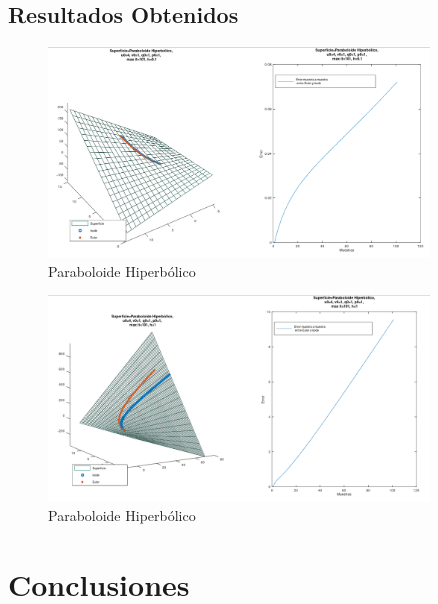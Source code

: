 \documentclass{endm}
\begin{document}
\subsection{Resultados Obtenidos}



\begin{figure}[H]
\caption{Paraboloide Hiperb\'olico}
\centering
\includegraphics[width=0.9\textwidth]{ph.png}
\end{figure}



\begin{figure}[H]
\caption{Paraboloide Hiperb\'olico}
\centering
\includegraphics[width=0.9\textwidth]{phmal.png}
\end{figure}




%
\section{Conclusiones}\label{Conclusiones}

\clearpage

%
\end{document}
